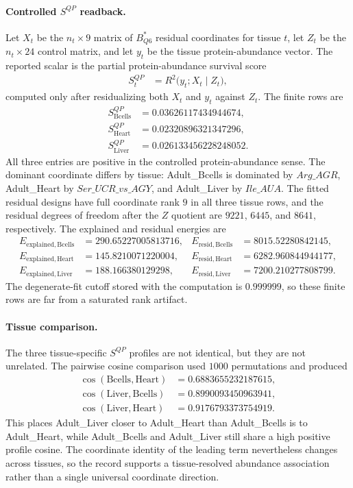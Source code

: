 \paragraph{Controlled $S^{QP}$ readback.}
Let $X_t$ be the $n_t\times 9$ matrix of $B^{\ast}_{Q6}$ residual coordinates for tissue $t$, let $Z_t$ be the $n_t\times 24$ control matrix, and let $y_t$ be the tissue protein-abundance vector.  The reported scalar is the partial protein-abundance survival score
$$
\begin{aligned}
S^{QP}_t &= R^2\bigl(y_t; X_t \mid Z_t\bigr),
\end{aligned}
$$
computed only after residualizing both $X_t$ and $y_t$ against $Z_t$.  The finite rows are
$$
\begin{aligned}
S^{QP}_{\mathrm{Bcells}} &= 0.03626117434944674,\\
S^{QP}_{\mathrm{Heart}} &= 0.02320896321347296,\\
S^{QP}_{\mathrm{Liver}} &= 0.026133456228248052.
\end{aligned}
$$
All three entries are positive in the controlled protein-abundance sense.  The dominant coordinate differs by tissue: Adult\_Bcells is dominated by $Arg\_AGR$, Adult\_Heart by $Ser\_UCR\_vs\_AGY$, and Adult\_Liver by $Ile\_AUA$.  The fitted residual designs have full coordinate rank $9$ in all three tissue rows, and the residual degrees of freedom after the $Z$ quotient are $9221$, $6445$, and $8641$, respectively.  The explained and residual energies are
$$
\begin{aligned}
E_{\mathrm{explained,Bcells}} &= 290.65227005813716,& E_{\mathrm{resid,Bcells}} &= 8015.52280842145,\\
E_{\mathrm{explained,Heart}} &= 145.8210071220004,& E_{\mathrm{resid,Heart}} &= 6282.960844944177,\\
E_{\mathrm{explained,Liver}} &= 188.166380129298,& E_{\mathrm{resid,Liver}} &= 7200.210277808799.
\end{aligned}
$$
The degenerate-fit cutoff stored with the computation is $0.999999$, so these finite rows are far from a saturated rank artifact.

\paragraph{Tissue comparison.}
The three tissue-specific $S^{QP}$ profiles are not identical, but they are not unrelated.  The pairwise cosine comparison used $1000$ permutations and produced
$$
\begin{aligned}
\cos(\mathrm{Bcells},\mathrm{Heart}) &= 0.6883655232187615,\\
\cos(\mathrm{Liver},\mathrm{Bcells}) &= 0.8990093450963941,\\
\cos(\mathrm{Liver},\mathrm{Heart}) &= 0.9176793373754919.
\end{aligned}
$$
This places Adult\_Liver closer to Adult\_Heart than Adult\_Bcells is to Adult\_Heart, while Adult\_Bcells and Adult\_Liver still share a high positive profile cosine.  The coordinate identity of the leading term nevertheless changes across tissues, so the record supports a tissue-resolved abundance association rather than a single universal coordinate direction.

